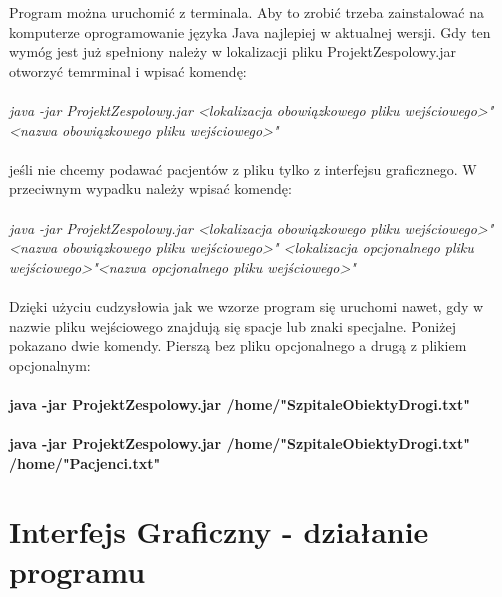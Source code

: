 \documentclass[10pt,a4paper]{article}
\begin{document}
Program można uruchomić z terminala. Aby to zrobić trzeba zainstalować na komputerze oprogramowanie języka Java najlepiej w aktualnej wersji. Gdy ten wymóg jest już spełniony należy w lokalizacji pliku ProjektZespolowy.jar otworzyć temrminal i wpisać komendę: \\
\\
\textsl{java -jar ProjektZespolowy.jar  \textless lokalizacja obowiązkowego pliku wejściowego\textgreater"\textless nazwa obowiązkowego pliku wejściowego\textgreater"}\\
\\jeśli nie chcemy podawać pacjentów z pliku tylko z interfejsu graficznego. W przeciwnym wypadku należy wpisać komendę: \\ \\
\textsl{java -jar ProjektZespolowy.jar  \textless lokalizacja obowiązkowego pliku wejściowego\textgreater"\textless nazwa obowiązkowego pliku wejściowego\textgreater"  \textless lokalizacja opcjonalnego pliku wejściowego\textgreater"\textless nazwa opcjonalnego pliku wejściowego\textgreater"}\\ \\
Dzięki użyciu cudzysłowia jak we wzorze program się uruchomi nawet, gdy w nazwie pliku wejściowego znajdują się spacje lub znaki specjalne. Poniżej pokazano dwie komendy. Pierszą bez pliku opcjonalnego a drugą z plikiem opcjonalnym: \\ \\
\textbf{java -jar ProjektZespolowy.jar /home/"SzpitaleObiektyDrogi.txt"} \\ \\ \textbf{java -jar ProjektZespolowy.jar /home/"SzpitaleObiektyDrogi.txt" \\ /home/"Pacjenci.txt"}

\section{Interfejs Graficzny - działanie programu}
\end{document}
